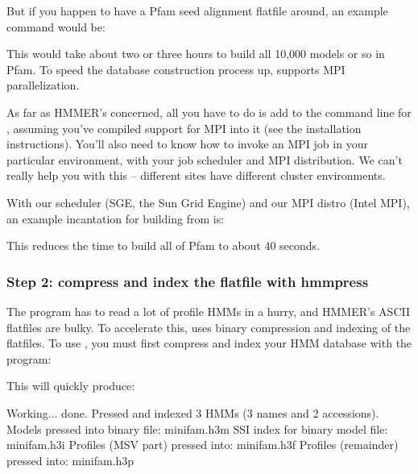 But if you happen to have a Pfam seed alignment flatfile
 around, an example command would be:


This would take about two or three hours to build all 10,000 models or
so in Pfam.  To speed the database construction process up,
 supports MPI parallelization. 

As far as HMMER's concerned, all you have to do is add  to
the command line for , assuming you've compiled support
for MPI into it (see the installation instructions).  You'll also need
to know how to invoke an MPI job in your particular environment, with
your job scheduler and MPI distribution. We can't really help you with
this -- different sites have different cluster environments.

With our scheduler (SGE, the Sun Grid Engine) and our MPI distro
(Intel MPI), an example incantation for building  from
 is:


This reduces the time to build all of Pfam to about 40 seconds.

\subsubsection{Step 2: compress and index the flatfile with hmmpress}

The  program has to read a lot of profile HMMs in a
hurry, and HMMER's ASCII flatfiles are bulky. To accelerate this,
 uses binary compression and indexing of the flatfiles.
To use , you must first compress and index your HMM
database with the  program:


This will quickly produce:

\begin{samepage}
\begin{sreoutput}
Working...    done.
Pressed and indexed 3 HMMs (3 names and 2 accessions).
Models pressed into binary file:   minifam.h3m
SSI index for binary model file:   minifam.h3i
Profiles (MSV part) pressed into:  minifam.h3f
Profiles (remainder) pressed into: minifam.h3p
\end{sreoutput}
\end{samepage}

